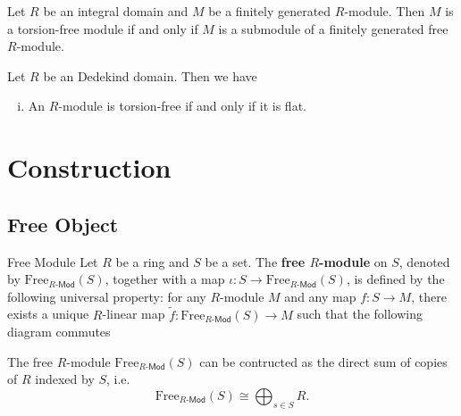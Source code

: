 \begin{proposition}{}{}
    Let $R$ be an integral domain and $M$ be a finitely generated $R$-module. Then $M$ is a torsion-free module if and only if $M$ is a submodule of a finitely generated free $R$-module.
\end{proposition}

\begin{proposition}{}{}
    Let $R$ be an Dedekind domain. Then we have
    \begin{enumerate}[(i)]
        \item An $R$-module is torsion-free if and only if it is flat.
    \end{enumerate}
\end{proposition}


\section{Construction}
\subsection{Free Object}
\begin{definition}{Free Module}{}
    Let $R$ be a ring and $S$ be a set. The \textbf{free $R$-module } on $S$, denoted by $\mathrm{Free}_{R\text{-}\mathsf{Mod}}(S)$, together with a map $\iota:S\to \mathrm{Free}_{R\text{-}\mathsf{Mod}}(S)$, is defined by the following universal property: for any $R$-module $M$ and any map $f:S\to M$, there exists a unique $R$-linear map $\widetilde{f}:\mathrm{Free}_{R\text{-}\mathsf{Mod}}(S)\to M$ such that the following diagram commutes
    \begin{center}
    \end{center}
    The free $R$-module $\mathrm{Free}_{R\text{-}\mathsf{Mod}}(S)$ can be contructed as the direct sum of copies of $R$ indexed by $S$, i.e. 
    \[
        \mathrm{Free}_{R\text{-}\mathsf{Mod}}(S)\cong \bigoplus_{s\in S}R.
    \]
\end{definition}



